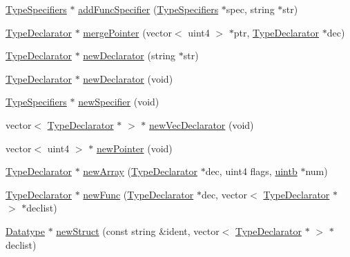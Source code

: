 \begin{DoxyCompactItemize}
\item 
\mbox{\hyperlink{struct_type_specifiers}{Type\+Specifiers}} $\ast$ \mbox{\hyperlink{class_c_parse_a41a5497a25d4911b58c1afdcbbaf73e9}{add\+Func\+Specifier}} (\mbox{\hyperlink{struct_type_specifiers}{Type\+Specifiers}} $\ast$spec, string $\ast$str)
\item 
\mbox{\hyperlink{class_type_declarator}{Type\+Declarator}} $\ast$ \mbox{\hyperlink{class_c_parse_a523baf902e71f296a214b79e644d7a35}{merge\+Pointer}} (vector$<$ uint4 $>$ $\ast$ptr, \mbox{\hyperlink{class_type_declarator}{Type\+Declarator}} $\ast$dec)
\item 
\mbox{\hyperlink{class_type_declarator}{Type\+Declarator}} $\ast$ \mbox{\hyperlink{class_c_parse_a98a9a8a0c3c277a80ad6655be29bc386}{new\+Declarator}} (string $\ast$str)
\item 
\mbox{\hyperlink{class_type_declarator}{Type\+Declarator}} $\ast$ \mbox{\hyperlink{class_c_parse_a8e8397c0be82ebe4bb75b23df8c79c01}{new\+Declarator}} (void)
\item 
\mbox{\hyperlink{struct_type_specifiers}{Type\+Specifiers}} $\ast$ \mbox{\hyperlink{class_c_parse_aa5639dc6bf599f11fafe7f0046a0ea59}{new\+Specifier}} (void)
\item 
vector$<$ \mbox{\hyperlink{class_type_declarator}{Type\+Declarator}} $\ast$ $>$ $\ast$ \mbox{\hyperlink{class_c_parse_af6cf05cad0d6b3edfc9faf953f33608f}{new\+Vec\+Declarator}} (void)
\item 
vector$<$ uint4 $>$ $\ast$ \mbox{\hyperlink{class_c_parse_aac29953596c1ce1c3ea97fb4d4fc6cab}{new\+Pointer}} (void)
\item 
\mbox{\hyperlink{class_type_declarator}{Type\+Declarator}} $\ast$ \mbox{\hyperlink{class_c_parse_acbe50e6dd40d382cbc178c4c448d4027}{new\+Array}} (\mbox{\hyperlink{class_type_declarator}{Type\+Declarator}} $\ast$dec, uint4 flags, \mbox{\hyperlink{types_8h_a2db313c5d32a12b01d26ac9b3bca178f}{uintb}} $\ast$num)
\item 
\mbox{\hyperlink{class_type_declarator}{Type\+Declarator}} $\ast$ \mbox{\hyperlink{class_c_parse_a9f32a2400060cd74285c5af4bcc4d490}{new\+Func}} (\mbox{\hyperlink{class_type_declarator}{Type\+Declarator}} $\ast$dec, vector$<$ \mbox{\hyperlink{class_type_declarator}{Type\+Declarator}} $\ast$ $>$ $\ast$declist)
\item 
\mbox{\hyperlink{class_datatype}{Datatype}} $\ast$ \mbox{\hyperlink{class_c_parse_a035ba6fa550e4a125b30689fef795208}{new\+Struct}} (const string \&ident, vector$<$ \mbox{\hyperlink{class_type_declarator}{Type\+Declarator}} $\ast$ $>$ $\ast$declist)

\end{DoxyCompactItemize}
